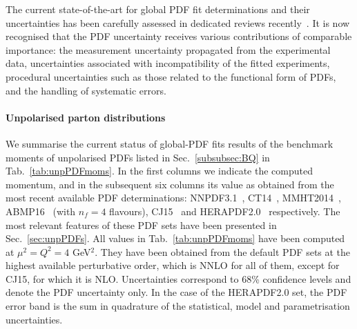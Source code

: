 The current state-of-the-art for global PDF fit determinations and their 
uncertainties has been carefully assessed in dedicated reviews
recently~\cite{Forte:2013wc,Jimenez-Delgado:2013sma}. 
%
It is now recognised that the PDF uncertainty receives various contributions 
of comparable importance: the measurement uncertainty propagated from the
experimental data, uncertainties associated with incompatibility of the 
fitted experiments, procedural uncertainties such as those related to the
functional form of PDFs, and the handling of systematic errors.
%




\paragraph{Unpolarised parton distributions}

We summarise the current status of global-PDF fits results of the benchmark
moments of unpolarised PDFs listed in Sec.~\ref{subsubsec:BQ} 
in Tab.~\ref{tab:unpPDFmoms}.
%
In the first columns we indicate the computed momentum, and in the subsequent 
six columns its value as obtained from the most recent available PDF 
determinations: NNPDF3.1~\cite{Ball:2017nwa},
CT14~\cite{Dulat:2015mca}, MMHT2014~\cite{Harland-Lang:2014zoa},
ABMP16~\cite{Alekhin:2017kpj} (with $n_f=4$ flavours), 
CJ15~\cite{Accardi:2016qay} and 
HERAPDF2.0~\cite{Abramowicz:2015mha} respectively.
%
The most relevant features of these PDF sets have been presented in 
Sec.~\ref{sec:unpPDFs}.
%
All values in Tab.~\ref{tab:unpPDFmoms} have been computed 
at $\mu^2=Q^2=4$ GeV$^2$. 
%
They have been obtained from the default PDF sets at the highest available 
perturbative order, which is NNLO for all of them, except for CJ15, 
for which it is NLO.
%
Uncertainties correspond to 68\% confidence levels and denote the PDF
uncertainty only.
%
In the case of the HERAPDF2.0 set, the PDF error band is the sum in quadrature 
of the statistical, model and parametrisation uncertainties.

